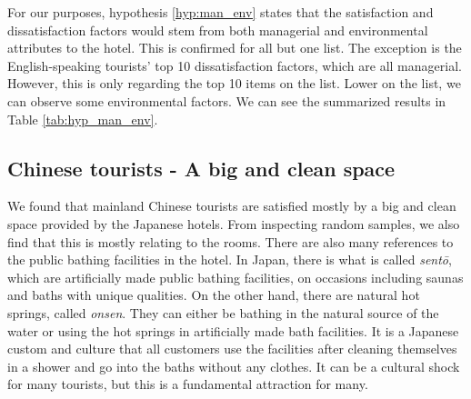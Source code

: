 \documentclass[smallextended,natbib]{svjour3}       %
\begin{document}
For our purposes, hypothesis \ref{hyp:man_env} states that the satisfaction and dissatisfaction factors would stem from both managerial and environmental attributes to the hotel. This is confirmed for all but one list. The exception is the English-speaking tourists' top 10 dissatisfaction factors, which are all managerial. However, this is only regarding the top 10 items on the list. Lower on the list, we can observe some environmental factors. We can see the summarized results in Table \ref{tab:hyp_man_env}. 


\begin{table}[h]
\caption{Managerial and Environmental nature of the 10 most frequent keywords}
\label{tab:hyp_man_env}
\end{table}

\subsection{Chinese tourists - A big and clean space}\label{disc:zh}

We found that mainland Chinese tourists are satisfied mostly by a big and clean space provided by the Japanese hotels. From inspecting random samples, we also find that this is mostly relating to the rooms. There are also many references to the public bathing facilities in the hotel. In Japan, there is what is called \textit{sent\=o}, which are artificially made public bathing facilities, on occasions including saunas and baths with unique qualities. On the other hand, there are natural hot springs, called \textit{onsen}. They can either be bathing in the natural source of the water or using the hot springs in artificially made bath facilities. It is a Japanese custom and culture that all customers use the facilities after cleaning themselves in a shower and go into the baths without any clothes. It can be a cultural shock for many tourists, but this is a fundamental attraction for many.
\end{document}
